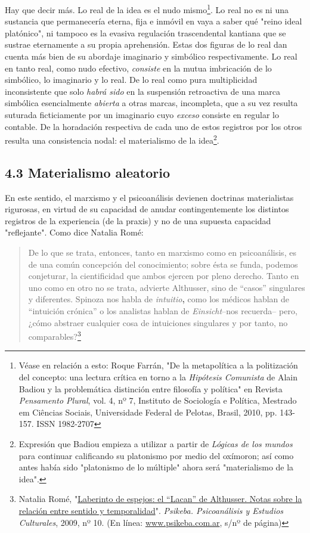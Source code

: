 \documentclass{book}
\begin{document}
Hay que decir más. Lo real de la idea es el nudo mismo\footnote{Véase en
  relación a esto: Roque Farrán, "De la metapolítica a la politización
  del concepto: una lectura crítica en torno a la \emph{Hipótesis
  Comunista} de Alain Badiou y la problemática distinción entre
  filosofía y política" en Revista \emph{Pensamento Plural}, vol. 4, nº
  7, Instituto de Sociología e Política, Mestrado em Ciências Sociais,
  Universidade Federal de Pelotas, Brasil, 2010, pp. 143-157. ISSN
  1982-2707}. Lo real no es ni una sustancia que permanecería eterna,
fija e inmóvil en vaya a saber qué "reino ideal platónico", ni tampoco
es la evasiva regulación trascendental kantiana que se sustrae
eternamente a su propia aprehensión. Estas dos figuras de lo real dan
cuenta más bien de su abordaje imaginario y simbólico respectivamente.
Lo real en tanto real, como nudo efectivo, \emph{consiste} en la mutua
imbricación de lo simbólico, lo imaginario y lo real. De lo real como
pura multiplicidad inconsistente que solo \emph{habrá sido} en la
suspensión retroactiva de una marca simbólica esencialmente
\emph{abierta} a otras marcas, incompleta, que a su vez resulta suturada
ficticiamente por un imaginario cuyo \emph{exceso} consiste en regular
lo contable. De la horadación respectiva de cada uno de estos registros
por los otros resulta una consistencia nodal: el materialismo de la
idea\footnote{Expresión que Badiou empieza a utilizar a partir de
  \emph{Lógicas de los mundos} para continuar calificando su platonismo
  por medio del oxímoron; así como antes había sido "platonismo de lo
  múltiple" ahora será "materialismo de la idea".}.

\subsection{4.3 Materialismo aleatorio}

En este sentido, el marxismo y el psicoanálisis devienen doctrinas
materialistas rigurosas, en virtud de su capacidad de anudar
contingentemente los distintos registros de la experiencia (de la
praxis) y no de una supuesta capacidad "reflejante". Como dice Natalia
Romé:

\begin{quote}
De lo que se trata, entonces, tanto en marxismo como en psicoanálisis,
es de una común concepción del conocimiento; sobre ésta se funda,
podemos conjeturar, la cientificidad que ambos ejercen por pleno
derecho. Tanto en uno como en otro no se trata, advierte Althusser, sino
de ``casos'' singulares y diferentes. Spinoza nos habla de
\emph{intuitio}\textbf{,} como los médicos hablan de ``intuición
crónica'' o los analistas hablan de \emph{Einsicht}--nos recuerda--
pero, ¿cómo abstraer cualquier cosa de intuiciones singulares y por
tanto, no comparables?\footnote{Natalia Romé,
  "\href{http://www.psikeba.com.ar/articulos2/NR_el_Lacan_de_Althusser.htm}{Laberinto
  de espejos: el ``Lacan'' de Althusser. Notas sobre la relación entre
  sentido y temporalidad}". \emph{Psikeba. Psicoanálisis y Estudios
  Culturales}, 2009, nº 10. (En línea:
  \href{http://www.psikeba.com.ar/}{www.psikeba.com.ar}, s/nº de página)}
\end{quote}
\end{document}
